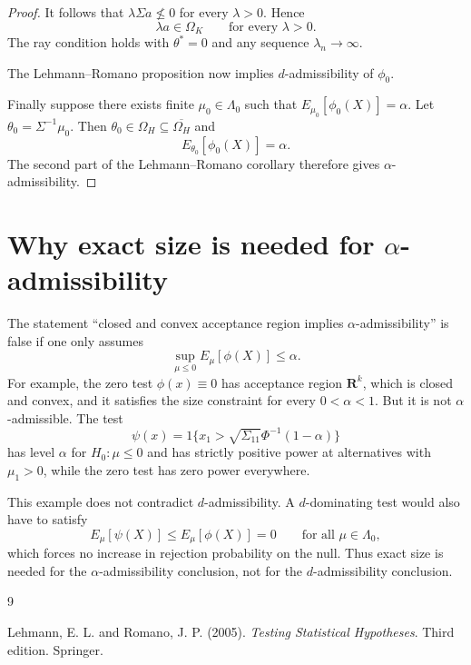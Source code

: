 \documentclass[11pt]{article}
\begin{document}
\begin{proof}
It follows that $\lambda\Sigma a\not\le 0$ for every $\lambda>0$. Hence
\[
\lambda a\in\Omega_K
\qquad\text{for every }\lambda>0.
\]
The ray condition holds with $\theta^*=0$ and any sequence $\lambda_n\to\infty$.

The Lehmann--Romano proposition now implies $d$-admissibility of $\phi_0$.

Finally suppose there exists finite $\mu_0\in\Lambda_0$ such that $E_{\mu_0}[\phi_0(X)]=\alpha$.  Let $\theta_0=\Sigma^{-1}\mu_0$.  Then $\theta_0\in\Omega_H\subseteq\overline{\Omega_H}$ and
\[
E_{\theta_0}[\phi_0(X)]=\alpha.
\]
The second part of the Lehmann--Romano corollary therefore gives $\alpha$-admissibility.
\end{proof}

\section{Why exact size is needed for $\alpha$-admissibility}

The statement ``closed and convex acceptance region implies $\alpha$-admissibility'' is false if one only assumes
\[
\sup_{\mu\le 0}E_\mu[\phi(X)]\le \alpha.
\]
For example, the zero test $\phi(x)\equiv 0$ has acceptance region $\mathbf R^k$, which is closed and convex, and it satisfies the size constraint for every $0<\alpha<1$. But it is not $\alpha$-admissible. The test
\[
\psi(x)=1\{x_1>\sqrt{\Sigma_{11}}\Phi^{-1}(1-\alpha)\}
\]
has level $\alpha$ for $H_0:\mu\le 0$ and has strictly positive power at alternatives with $\mu_1>0$, while the zero test has zero power everywhere.

This example does not contradict $d$-admissibility. A $d$-dominating test would also have to satisfy
\[
E_\mu[\psi(X)]\le E_\mu[\phi(X)]=0
\qquad\text{for all }\mu\in\Lambda_0,
\]
which forces no increase in rejection probability on the null. Thus exact size is needed for the $\alpha$-admissibility conclusion, not for the $d$-admissibility conclusion.

\begin{thebibliography}{9}

Lehmann, E. L. and Romano, J. P. (2005).
\textit{Testing Statistical Hypotheses}.
Third edition. Springer.

\end{thebibliography}
\end{document}
